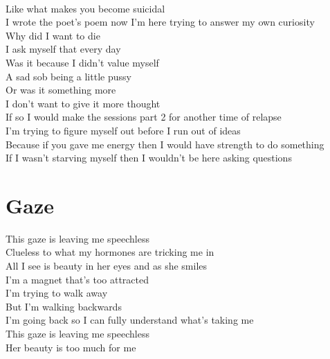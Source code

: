 \documentclass[12pt, b5paper, oneside]{book}
\begin{document}
\\Like what makes you become suicidal
\\I wrote the poet's poem now I'm here trying to answer my own curiosity
\\Why did I want to die
\\I ask myself that every day
\\Was it because I didn't value myself
\\A sad sob being a little pussy
\\Or was it something more
\\I don't want to give it more thought
\\If so I would make the sessions part 2 for another time of relapse
\\I'm trying to figure myself out before I run out of ideas
\\Because if you gave me energy then I would have strength to do something
\\If I wasn't starving myself then I wouldn't be here asking questions 
\newpage
\section{Gaze}
This gaze is leaving me speechless
\\Clueless to what my hormones are tricking me in 
\\All I see is beauty in her eyes and as she smiles
\\I'm a magnet that's too attracted 
\\I'm trying to walk away 
\\But I'm walking backwards 
\\I'm going back so I can fully understand what's taking me 
\\This gaze is leaving me speechless 
\\Her beauty is too much for me 
\newpage
\end{document}
